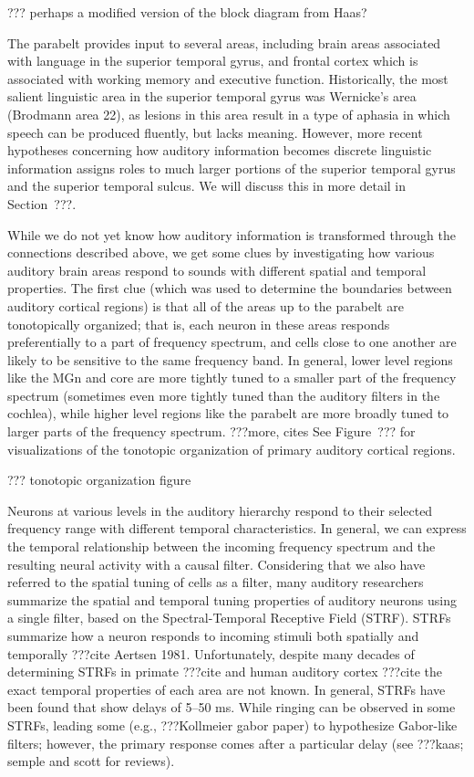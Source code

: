 ??? perhaps a modified version of the block diagram from Haas?

The parabelt provides input
to several areas,
including brain areas
associated with language
in the superior temporal gyrus,
and frontal cortex which is associated
with working memory and executive function.
Historically, the most
salient linguistic area
in the superior temporal gyrus
was Wernicke's area (Brodmann area 22),
as lesions in this area result in
a type of aphasia in which
speech can be produced fluently,
but lacks meaning.
However, more recent hypotheses
concerning how auditory information
becomes discrete linguistic information
assigns roles to much larger portions
of the superior temporal gyrus
and the superior temporal sulcus.
We will discuss this in more detail
in Section~???.

While we do not yet know how auditory information
is transformed through the connections
described above,
we get some clues by investigating
how various auditory brain areas
respond to sounds with different
spatial and temporal properties.
The first clue
(which was used to determine the boundaries
between auditory cortical regions)
is that all of the areas
up to the parabelt are
tonotopically organized;
that is, each neuron in these areas
responds preferentially to
a part of frequency spectrum,
and cells close to one another
are likely to be sensitive
to the same frequency band.
In general, lower level regions
like the MGn and core
are more tightly tuned
to a smaller part of the frequency spectrum
(sometimes even more tightly tuned
than the auditory filters in the cochlea),
while higher level regions
like the parabelt
are more broadly tuned
to larger parts of the frequency spectrum.
???more, cites
See Figure~??? for visualizations
of the tonotopic organization
of primary auditory cortical regions.

??? tonotopic organization figure

Neurons at various levels in the auditory hierarchy
respond to their selected frequency range
with different temporal characteristics.
In general, we can express the temporal
relationship between the incoming
frequency spectrum and the resulting
neural activity with a causal filter.
Considering that we also
have referred to the spatial tuning
of cells as a filter,
many auditory researchers
summarize the spatial and temporal
tuning properties of auditory neurons
using a single filter,
based on the
Spectral-Temporal Receptive Field (STRF).
STRFs summarize how a neuron responds
to incoming stimuli both spatially
and temporally ???cite Aertsen 1981.
Unfortunately, despite many decades
of determining STRFs in
primate ???cite and human auditory cortex ???cite
the exact temporal properties of
each area are not known.
In general, STRFs have been found that
show delays of 5--50 ms.
While ringing can be observed
in some STRFs, leading some
(e.g., ???Kollmeier gabor paper)
to hypothesize Gabor-like filters;
however, the primary response comes
after a particular delay
(see ???kaas; semple and scott for reviews).

